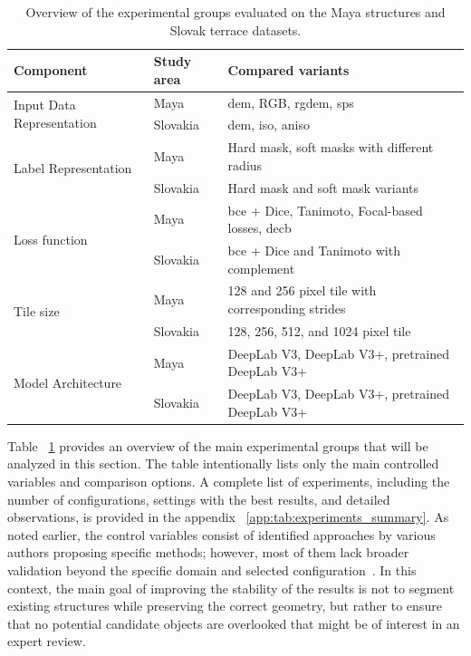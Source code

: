 \begin{table}[H]
\centering
\small
\setlength{\tabcolsep}{4pt}
\renewcommand{\arraystretch}{1.25}

\begin{tabularx}{\textwidth}{@{}p{3.8cm} p{1.8cm} X@{}}
\toprule
\textbf{Component} &
\textbf{Study area} &
\textbf{Compared variants} \\
\midrule

\multirow{2}{=}{Input Data Representation} &
Maya & \gls{dem}, RGB, \gls{rgdem}, \gls{sps} \\
&
Slovakia & \gls{dem}, \gls{iso}, \gls{aniso} \\
\midrule

\multirow{2}{=}{Label Representation} &
Maya & Hard mask, soft masks with different radius \\
&
Slovakia & Hard mask and soft mask variants \\
\midrule

\multirow{2}{=}{Loss function} &
Maya & \gls{bce} + Dice, Tanimoto, Focal-based losses, \gls{decb} \\
&
Slovakia & \gls{bce} + Dice and Tanimoto with complement \\
\midrule

\multirow{2}{=}{Tile size} &
Maya & 128 and 256 pixel tile with corresponding strides \\
&
Slovakia & 128, 256, 512, and 1024 pixel tile \\
\midrule

\multirow{2}{=}{Model Architecture} &
Maya & DeepLab V3, DeepLab V3+, pretrained DeepLab V3+ \\
&
Slovakia & DeepLab V3, DeepLab V3+, pretrained DeepLab V3+ \\

\bottomrule
\end{tabularx}

\caption{Overview of the experimental groups evaluated on the Maya structures and Slovak terrace datasets.}
\label{tab:experiments_overview}
\end{table}

Table ~\ref{tab:experiments_overview} provides an overview of the main experimental groups that will be analyzed in this section. The table intentionally lists only the main controlled variables and comparison options. A complete list of experiments, including the number of configurations, settings with the best results, and detailed observations, is provided in the appendix ~\ref{app:tab:experiments_summary}. As noted earlier, the control variables consist of identified approaches by various authors proposing specific methods; however, most of them lack broader validation beyond the specific domain and selected configuration~\cite{kokalj_standardizing_2025,trier_using_2019,guyot_combined_2021,fylaktos_deep_2025}. In this context, the main goal of improving the stability of the results is not to segment existing structures while preserving the correct geometry, but rather to ensure that no potential candidate objects are overlooked that might be of interest in an expert review.

